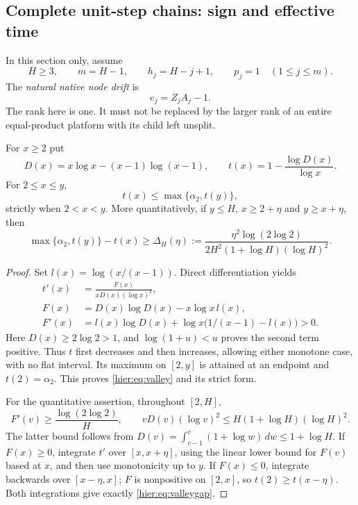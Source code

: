 \subsection{Complete unit-step chains: sign and effective time}

In this section only, assume
\[
 H\ge3,\qquad m=H-1,\qquad h_j=H-j+1,
 \qquad p_j=1\quad(1\le j\le m).
\]
The \emph{natural native node drift} is
\begin{equation}
 e_j=Z_jA_j-1. \label{hier:eq:nodedrift}
\end{equation}
The rank here is one. It must not be replaced by the larger rank of
an entire equal-product platform with its child left unsplit.

\begin{lemma}\label{hier:lem:valley}
For $x\ge2$ put
\[
 D(x)=x\log x-(x-1)\log(x-1),\qquad
 t(x)=1-\frac{\log D(x)}{\log x}.
\]
For $2\le x\le y$,
\begin{equation}
 t(x)\le\max\{\alpha_2,t(y)\}, \label{hier:eq:valley}
\end{equation}
strictly when $2<x<y$. More quantitatively, if $y\le H$,
$x\ge2+\eta$ and $y\ge x+\eta$, then
\begin{equation}
 \max\{\alpha_2,t(y)\}-t(x)\ge
 \Delta_H(\eta):=
 \frac{\eta^2\log(2\log2)}{2H^2(1+\log H)(\log H)^2}.
 \label{hier:eq:valleygap}
\end{equation}
\end{lemma}
\begin{proof}
Set $l(x)=\log(x/(x-1))$. Direct differentiation yields
\begin{align}
 t'(x)&=\frac{F(x)}{xD(x)(\log x)^2},\\
 F(x)&=D(x)\log D(x)-x\log x\,l(x),\\
 F'(x)&=l(x)\log D(x)
       +\log x\bigl(1/(x-1)-l(x)\bigr)>0.
 \label{hier:eq:Fprime}
\end{align}
Here $D(x)\ge2\log2>1$, and $\log(1+u)<u$ proves the second
term positive. Thus $t$ first decreases and then increases, allowing
either monotone case, with no flat interval. Its maximum on $[2,y]$
is attained at an endpoint and $t(2)=\alpha_2$. This proves
\eqref{hier:eq:valley} and its strict form.

For the quantitative assertion, throughout $[2,H]$,
\[
 F'(v)\ge\frac{\log(2\log2)}H,
 \qquad vD(v)(\log v)^2\le H(1+\log H)(\log H)^2.
\]
The latter bound follows from
$D(v)=\int_{v-1}^v(1+\log w)\,dw\le1+\log H$.
If $F(x)\ge0$, integrate $t'$ over $[x,x+\eta]$, using the
linear lower bound for $F(v)$ based at $x$, and then use monotonicity
up to $y$. If $F(x)\le0$, integrate backwards over $[x-\eta,x]$;
$F$ is nonpositive on $[2,x]$, so $t(2)\ge t(x-\eta)$.
Both integrations give exactly \eqref{hier:eq:valleygap}.
\end{proof}

